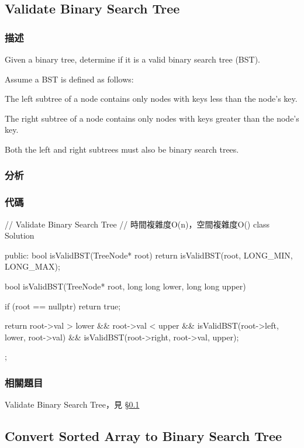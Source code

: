 \subsection{Validate Binary Search Tree}
\label{sec:validate-binary-search-tree}


\subsubsection{描述}
Given a binary tree, determine if it is a valid binary search tree (BST).

Assume a BST is defined as follows:
\begindot
\item The left subtree of a node contains only nodes with keys less than the node's key.
\item The right subtree of a node contains only nodes with keys greater than the node's key.
\item Both the left and right subtrees must also be binary search trees.
\myenddot


\subsubsection{分析}


\subsubsection{代碼}

\begin{Code}
// Validate Binary Search Tree
// 時間複雜度O(n)，空間複雜度O(\logn)
class Solution {
public:
    bool isValidBST(TreeNode* root) {
        return isValidBST(root, LONG_MIN, LONG_MAX);
    }

    bool isValidBST(TreeNode* root, long long lower, long long upper) {
        if (root == nullptr) return true;

        return root->val > lower && root->val < upper
                && isValidBST(root->left, lower, root->val)
                && isValidBST(root->right, root->val, upper);
    }
};
\end{Code}


\subsubsection{相關題目}
\begindot
\item Validate Binary Search Tree，見 \S \ref{sec:validate-binary-search-tree}
\myenddot


\subsection{Convert Sorted Array to Binary Search Tree}
\label{sec:convert-sorted-array-to-binary-search-tree}


